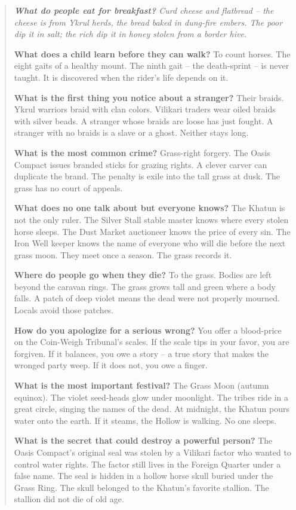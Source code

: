 \documentclass[12pt,oneside]{book}
\newenvironment{almanac}
  {\begin{quote}\small\itshape}
  {\end{quote}}
\begin{document}
\vspace{1em}
\begin{almanac}
\textbf{What do people eat for breakfast?} Curd cheese and flatbread -- the cheese is from Ykrul herds, the bread baked in dung-fire embers. The poor dip it in salt; the rich dip it in honey stolen from a border hive.

\textbf{What does a child learn before they can walk?} To count horses. The eight gaits of a healthy mount. The ninth gait -- the death-sprint -- is never taught. It is discovered when the rider's life depends on it.

\textbf{What is the first thing you notice about a stranger?} Their braids. Ykrul warriors braid with clan colors. Vilikari traders wear oiled braids with silver beads. A stranger whose braids are loose has just fought. A stranger with no braids is a slave or a ghost. Neither stays long.

\textbf{What is the most common crime?} Grass-right forgery. The Oasis Compact issues branded sticks for grazing rights. A clever carver can duplicate the brand. The penalty is exile into the tall grass at dusk. The grass has no court of appeals.

\textbf{What does no one talk about but everyone knows?} The Khatun is not the only ruler. The Silver Stall stable master knows where every stolen horse sleeps. The Dust Market auctioneer knows the price of every sin. The Iron Well keeper knows the name of everyone who will die before the next grass moon. They meet once a season. The grass records it.

\textbf{Where do people go when they die?} To the grass. Bodies are left beyond the caravan rings. The grass grows tall and green where a body falls. A patch of deep violet means the dead were not properly mourned. Locals avoid those patches.

\textbf{How do you apologize for a serious wrong?} You offer a blood-price on the Coin-Weigh Tribunal's scales. If the scale tips in your favor, you are forgiven. If it balances, you owe a story -- a true story that makes the wronged party weep. If it does not, you owe a finger.

\textbf{What is the most important festival?} The Grass Moon (autumn equinox). The violet seed-heads glow under moonlight. The tribes ride in a great circle, singing the names of the dead. At midnight, the Khatun pours water onto the earth. If it steams, the Hollow is walking. No one sleeps.

\textbf{What is the secret that could destroy a powerful person?} The Oasis Compact's original seal was stolen by a Vilikari factor who wanted to control water rights. The factor still lives in the Foreign Quarter under a false name. The seal is hidden in a hollow horse skull buried under the Grass Ring. The skull belonged to the Khatun's favorite stallion. The stallion did not die of old age.
\end{almanac}
\end{document}
